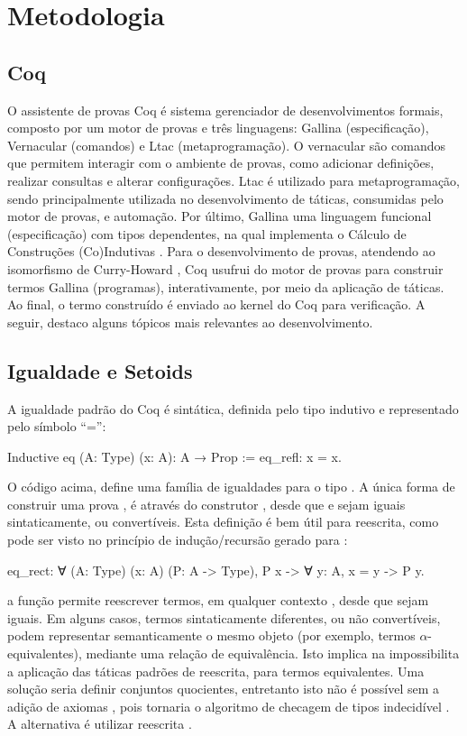 \chapter{Metodologia}\label{chp:metodologia}

\section{Coq}
O assistente de provas Coq \cite{Coq2021} é sistema gerenciador de desenvolvimentos formais, composto por um motor de provas e três linguagens: Gallina (especificação), Vernacular (comandos) e Ltac (metaprogramação). O vernacular são comandos que permitem interagir com o ambiente de provas, como adicionar definições, realizar consultas e alterar configurações. Ltac é utilizado para metaprogramação, sendo principalmente utilizada no desenvolvimento de táticas, consumidas pelo motor de provas, e automação. Por último, Gallina uma linguagem funcional (especificação) com tipos dependentes, na qual implementa o Cálculo de Construções (Co)Indutivas \cite{Coquand1988,Coquand1990,PaulinMohring1993}. Para o desenvolvimento de provas, atendendo ao isomorfismo de Curry-Howard \cite{Soerensen2006}, Coq usufrui do motor de provas para construir termos Gallina (programas), interativamente, por meio da aplicação de táticas. Ao final, o termo construído é enviado ao kernel do Coq para verificação. A seguir, destaco alguns tópicos mais relevantes ao desenvolvimento.

\section{Igualdade e Setoids}
A igualdade padrão do Coq é sintática, definida pelo tipo indutivo  e representado pelo símbolo ``='':
\begin{coqcode}
Inductive eq (A: Type) (x: A): A → Prop := eq_refl: x = x.	
\end{coqcode}
O código acima, define uma família de igualdades para o tipo . A única forma de construir uma prova , é através do construtor , desde que  e  sejam iguais sintaticamente, ou convertíveis. Esta definição é bem útil para reescrita, como pode ser visto no princípio de indução/recursão gerado para :
\begin{coqcode}
eq_rect: ∀ (A: Type) (x: A) (P: A -> Type), P x -> ∀ y: A, x = y -> P y.
\end{coqcode}
a função  permite reescrever termos, em qualquer contexto , desde que sejam iguais. Em alguns casos, termos sintaticamente diferentes, ou não convertíveis, podem representar semanticamente o mesmo objeto (por exemplo, termos $\alpha$-equivalentes), mediante uma relação de equivalência. Isto implica na impossibilita a aplicação das táticas padrões de reescrita, para termos equivalentes. Uma solução seria definir conjuntos quocientes, entretanto isto não é possível sem a adição de axiomas \cite{Chicli2003}, pois tornaria o algoritmo de checagem de tipos indecidível \cite{Geuvers2002}. A alternativa é utilizar reescrita \setoid. %

